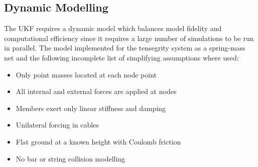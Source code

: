 {\subsection{Dynamic Modelling} 

The UKF requires a dynamic model which balances model fidelity and computational efficiency since it requires a large number of simulations to be run in parallel. 
The model implemented for the tensegrity system as a spring-mass net and the following incomplete list of simplifying assumptions where used:
\begin{itemize}
  \item Only point masses located at each node point
  \item All internal and external forces are applied at nodes
  \item Members exert only linear stiffness and damping
  \item Unilateral forcing in cables
  \item Flat ground at a known height with Coulomb friction
  \item No bar or string collision modelling
\end{itemize}

}
